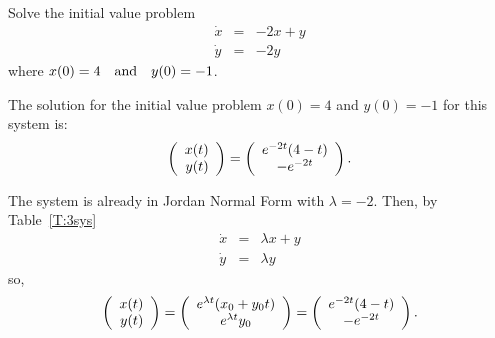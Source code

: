 \documentclass{ximera}
\begin{document}
\begin{exercise} \label{c6.3.2}
Solve the initial value problem
\[
\begin{array}{rcr}
\dot{x} & = & -2x + y \\
\dot{y} & = & -2y
\end{array}
\]
where $x(0) = 4  \quad\mbox{and}\quad y(0) = -1$.

\begin{solution}

\ans The solution for the initial value problem $x(0) = 4$ and
$y(0) = -1$ for this system is:
\[
\left(\begin{array}{r} x(t) \\ y(t)\end{array}\right) = \left(\begin{array}{c} e^{-2t}(4 - t) \\ -e^{-2t}\end{array}\right).
\]

\soln The system is already in Jordan Normal Form with $\lambda = -2$.  Then, by Table~\ref{T:3sys}
\[
\begin{array}{rrr}
\dot{x} & = & \lambda x + y \\
\dot{y} & = & \lambda y \end{array}
\]
so, 
\[
\left(\begin{array}{r} x(t) \\ y(t)\end{array}\right) = \left(\begin{array}{c} e^{\lambda t}(x_0 + y_0t) \\ e^{\lambda t}y_0\end{array}\right)
= \left(\begin{array}{c} e^{-2t}(4 - t) \\ -e^{-2t}\end{array}\right).
\]

\end{solution}
\end{exercise}
\end{document}
